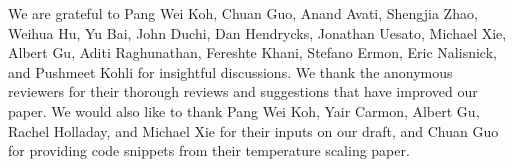 We are grateful to Pang Wei Koh, Chuan Guo, Anand Avati, Shengjia Zhao, Weihua Hu, Yu Bai, John Duchi, Dan Hendrycks, Jonathan Uesato, Michael Xie, Albert Gu, Aditi Raghunathan, Fereshte Khani, Stefano Ermon, Eric Nalisnick, and Pushmeet Kohli for insightful discussions. We thank the anonymous reviewers for their thorough reviews and suggestions that have improved our paper. We would also like to thank Pang Wei Koh, Yair Carmon, Albert Gu, Rachel Holladay, and Michael Xie for their inputs on our draft, and Chuan Guo for providing code snippets from their temperature scaling paper.






